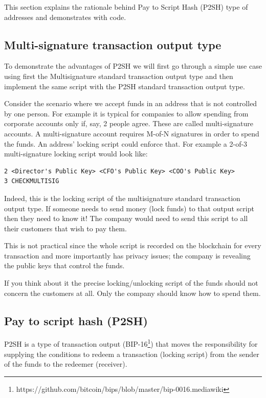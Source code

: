 This section explains the rationale behind Pay to Script Hash (P2SH) type of addresses and demonstrates with code.

\subsection*{Multi-signature transaction output type}
To demonstrate the advantages of P2SH we will first go through a simple use case using first the Multisignature standard transaction output type and then implement the same script with the P2SH standard transaction output type.

Consider the scenario where we accept funds in an address that is not controlled by one person. For example it is typical for companies to allow spending from corporate accounts only if, say, 2 people agree. These are called multi-signature accounts. A multi-signature account requires M-of-N signatures in order to spend the funds. An address’ locking script could enforce that. For example a 2-of-3 multi-signature locking script would look like:

\begin{emphbox}
\begin{lstlisting}[style=Pseudomath]
2 <Director's Public Key> <CFO's Public Key> <COO's Public Key> 
3 CHECKMULTISIG
\end{lstlisting}
\end{emphbox}

Indeed, this is the locking script of the multisignature standard transaction output type. If someone needs to send money (lock funds) to that output script then they need to know it! The company would need to send this script to all their customers that wish to pay them.

This is not practical since the whole script is recorded on the blockchain for every transaction and more importantly has privacy issues; the company is revealing the public keys that control the funds.

If you think about it the precise locking/unlocking script of the funds should not concern the customers at all. Only the company should know how to spend them.


\subsection*{Pay to script hash (P2SH)}
P2SH is a type of transaction output (BIP-16\footnote{https://github.com/bitcoin/bips/blob/master/bip-0016.mediawiki}) that moves the responsibility for supplying the conditions to redeem a transaction (locking script) from the sender of the funds to the redeemer (receiver).


